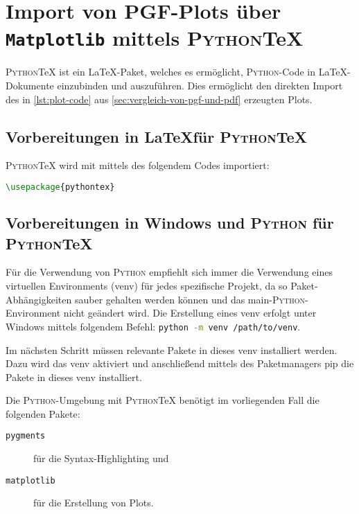 \documentclass[class=tudscrartcl, crop=false, cdfont=false, cd=true]{standalone}
\newcommand*{\python}{\mbox{\textsc{Python}}\xspace}
\newcommand*{\matplotlib}{\mbox{\texttt{Matplotlib}}\xspace}
\newcommand*{\pythontex}{\mbox{\textsc{Python}}\TeX\xspace}
\begin{document}
    \section{Import von PGF-Plots über \matplotlib mittels \pythontex}\label{sec:import-von-pgf-plots-uber-matplotlib-mittels-pythontex}
    \pythontex ist ein \LaTeX-Paket, welches es ermöglicht, \python-Code in \LaTeX-Dokumente einzubinden und auszuführen.
    Dies ermöglicht den direkten Import des in \autoref{lst:plot-code} aus \autoref{sec:vergleich-von-pgf-und-pdf} erzeugten Plots.

    \subsection{Vorbereitungen in \LaTeX für \pythontex}\label{subsec:vorbereitungen-in-latex-fuer-pythontex}
    \pythontex wird mit mittels des folgendem Codes importiert:
\begin{lstlisting}[language=TeX, style=latexstyle, caption=Einbinden von \pythontex,label={lst:pythontex-packages}]
\usepackage{pythontex}
\end{lstlisting}

    \subsection{Vorbereitungen in Windows und \python für \pythontex}\label{subsec:vorbereitungen-in-python-fuer-pythontex}

    Für die Verwendung von \python empfiehlt sich immer die Verwendung eines virtuellen Environments (venv) für jedes spezifische Projekt, da so Paket-Abhängigkeiten sauber gehalten werden können und das main-\python-Environment nicht geändert wird.
    Die Erstellung eines venv erfolgt unter Windows mittels folgendem Befehl: \lstinline[language=bash]|python -m venv /path/to/venv|.

    Im nächsten Schritt müssen relevante Pakete in dieses venv installiert werden.
    Dazu wird das venv aktiviert und anschließend mittels des Paketmanagers pip die Pakete in dieses venv installiert.

    Die \python-Umgebung mit \pythontex benötigt im vorliegenden Fall die folgenden Pakete:
    \begin{description}
        \item[\texttt{pygments}] für die Syntax-Highlighting und
        \item[\texttt{matplotlib}] für die Erstellung von Plots.
    \end{description}
\end{document}
